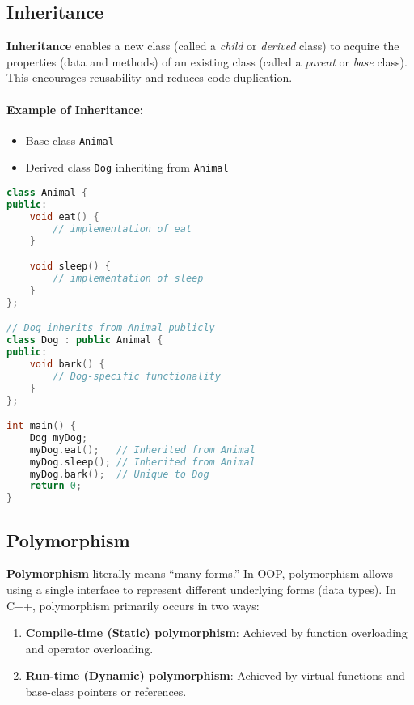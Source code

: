 \documentclass[a4paper,12pt]{article}
\begin{document}
\subsection{Inheritance}
\textbf{Inheritance} enables a new class (called a \textit{child} or \textit{derived} class) to acquire the properties (data and methods) of an existing class (called a \textit{parent} or \textit{base} class). This encourages reusability and reduces code duplication.

\paragraph{Example of Inheritance:} 
\begin{itemize}
    \item Base class \texttt{Animal}
    \item Derived class \texttt{Dog} inheriting from \texttt{Animal}
\end{itemize}

\begin{lstlisting}[language=C++]
class Animal {
public:
    void eat() {
        // implementation of eat
    }

    void sleep() {
        // implementation of sleep
    }
};

// Dog inherits from Animal publicly
class Dog : public Animal {
public:
    void bark() {
        // Dog-specific functionality
    }
};

int main() {
    Dog myDog;
    myDog.eat();   // Inherited from Animal
    myDog.sleep(); // Inherited from Animal
    myDog.bark();  // Unique to Dog
    return 0;
}
\end{lstlisting}

\newpage

\subsection{Polymorphism}
\textbf{Polymorphism} literally means ``many forms.'' In OOP, polymorphism allows using a single interface to represent different underlying forms (data types). In C++, polymorphism primarily occurs in two ways:
\begin{enumerate}
    \item \textbf{Compile-time (Static) polymorphism}: Achieved by function overloading and operator overloading.
    \item \textbf{Run-time (Dynamic) polymorphism}: Achieved by virtual functions and base-class pointers or references.
\end{enumerate}
\end{document}
